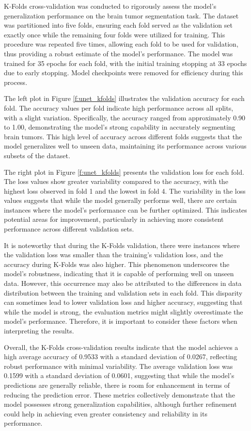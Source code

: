 K-Folds cross-validation was conducted to rigorously assess the model's generalization performance on the brain tumor segmentation task. The dataset was partitioned into five folds, ensuring each fold served as the validation set exactly once while the remaining four folds were utilized for training. This procedure was repeated five times, allowing each fold to be used for validation, thus providing a robust estimate of the model's performance. The model was trained for 35 epochs for each fold, with the initial training stopping at 33 epochs due to early stopping. Model checkpoints were removed for efficiency during this process.

The left plot in Figure \ref{f:unet_kfolds} illustrates the validation accuracy for each fold. The accuracy values per fold indicate high performance across all splits, with a slight variation. Specifically, the accuracy ranged from approximately 0.90 to 1.00, demonstrating the model's strong capability in accurately segmenting brain tumors. This high level of accuracy across different folds suggests that the model generalizes well to unseen data, maintaining its performance across various subsets of the dataset.

The right plot in Figure \ref{f:unet_kfolds} presents the validation loss for each fold. The loss values show greater variability compared to the accuracy, with the highest loss observed in fold 1 and the lowest in fold 4. The variability in the loss values suggests that while the model generally performs well, there are certain instances where the model's performance can be further optimized. This indicates potential areas for improvement, particularly in achieving more consistent performance across different validation sets.

It is noteworthy that during the K-Folds validation, there were instances where the validation loss was smaller than the training's validation loss, and the accuracy during K-Folds was also higher. This phenomenon underscores the model's robustness, indicating that it is capable of performing well on unseen data. However, this occurrence may also be attributed to the differences in data distribution between the training and validation sets in each fold. This disparity can sometimes lead to lower validation loss and higher accuracy, suggesting that while the model is strong, the evaluation metrics might slightly overestimate the model's performance. Therefore, it is important to consider these factors when interpreting the results.

Overall, the K-Folds cross-validation results indicate that the model achieves a high average accuracy of 0.9533 with a standard deviation of 0.0267, reflecting robust performance with minimal variability. The average validation loss was 0.1599 with a standard deviation of 0.0601, suggesting that while the model's predictions are generally reliable, there is room for enhancement in terms of reducing the prediction error. These metrics collectively demonstrate that the model possesses strong generalization capabilities, although further refinement could help in achieving even greater consistency and reliability in its performance.

